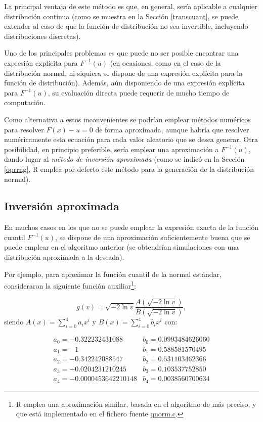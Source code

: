 \documentclass[
  spanish,
  10pt,
]{book}
\theoremstyle{break}
\theoremstyle{nonumberplain}
\let\oldfootnote\footnote
\renewcommand\footnote[1]{\oldfootnote{\hspace{2mm}#1}}
\begin{document}
La principal ventaja de este método es que, en general, sería aplicable a cualquier distribución continua (como se muestra en la Sección \ref{transcuant}, se puede extender al caso de que la función de distribución no sea invertible, incluyendo distribuciones discretas).

Uno de los principales problemas es que puede no ser posible encontrar una expresión explícita para \(F^{-1}( u )\) (en ocasiones, como en el caso de la distribución normal, ni siquiera se dispone de una expresión explícita para la función de distribución).
Además, aún disponiendo de una expresión explícita para \(F^{-1}( u )\), su evaluación directa puede requerir de mucho tiempo de computación.

Como alternativa a estos inconvenientes se podrían emplear métodos numéricos para resolver \(F(x) - u = 0\) de forma aproximada, aunque habría que resolver numéricamente esta ecuación para cada valor aleatorio que se desea generar.
Otra posibilidad, en principio preferible, sería emplear una aproximación a \(F^{-1}( u )\), dando lugar al \emph{método de inversión aproximada} (como se indicó en la Sección \ref{oprrng}, R emplea por defecto este método para la generación de la distribución normal).

\subsection{Inversión aproximada}\label{inversiuxf3n-aproximada}

En muchos casos en los que no se puede emplear la expresión exacta de la función cuantil \(F^{-1}( u )\), se dispone de una aproximación suficientemente buena que se puede emplear en el algoritmo anterior (se obtendrían simulaciones con una distribución aproximada a la deseada).

Por ejemplo, para aproximar la función cuantil de la normal estándar, \citet{odeh1974} consideraron la siguiente función auxiliar\footnote{R emplea una aproximación similar, basada en el algoritmo de \citet{wichura1988} más preciso, y que está implementado en el fichero fuente \href{https://svn.r-project.org/R/trunk/src/nmath/qnorm.c}{qnorm.c}.}:

\[ g\left( v\right)  =\sqrt{-2\ln v}\frac{A\left( \sqrt{-2\ln v}\right)
}{B\left( \sqrt{-2\ln v}\right)  },\]
siendo \(A(x) =\sum_{i=0}^{4}a_{i}x^{i}\)
y \(B(x)  =\sum_{i=0}^{4}b_{i}x^{i}\) con:

\[\begin{array}{ll}
a_{0}=-0.322232431088 &  b_{0}=0.0993484626060 \\
a_{1}=-1 &  b_{1}=0.588581570495 \\
a_{2}=-0.342242088547 & b_{2}=0.531103462366 \\
a_{3}=-0.0204231210245 & b_{3}=0.103537752850 \\
a_{4}=-0.0000453642210148 & b_{4}=0.0038560700634
\end{array}\]
\end{document}
